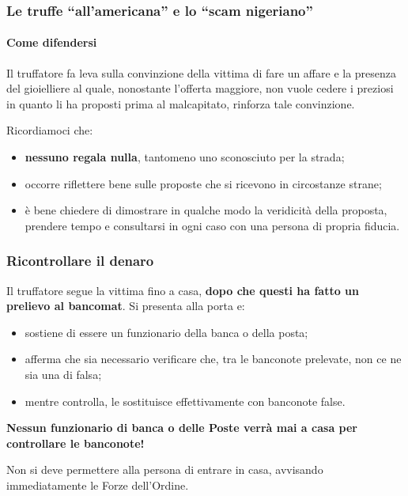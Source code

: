 \documentclass[11pt]{beamer}
\begin{document}
	\begin{frame}
		\frametitle{Le truffe ``all'americana'' e lo ``scam nigeriano''}
		\framesubtitle{Come difendersi}
		
		Il truffatore fa leva sulla convinzione della vittima di fare un affare e la presenza del gioielliere al quale, nonostante l'offerta maggiore, non vuole cedere i preziosi in quanto li ha proposti prima al malcapitato, rinforza tale convinzione.
		
		Ricordiamoci che:
		\begin{itemize}
			\item \textbf{nessuno regala nulla}, tantomeno uno sconosciuto per la strada;
			\item occorre riflettere bene sulle proposte che si ricevono in circostanze strane;
			\item è bene chiedere di dimostrare in qualche modo la veridicità della proposta, prendere tempo e consultarsi in ogni caso con una persona di propria fiducia.
		\end{itemize}	
	\end{frame}
	
	\begin{frame}
		\frametitle{Ricontrollare il denaro}
		
		Il truffatore segue la vittima fino a casa, \textbf{dopo che questi ha fatto un prelievo al bancomat}. Si presenta alla porta e:
		\begin{itemize}
			\item sostiene di essere un funzionario della banca o della posta;
			\item afferma che sia necessario verificare che, tra le banconote prelevate, non ce ne sia una di falsa;
			\item mentre controlla, le sostituisce effettivamente con banconote false.
		\end{itemize}
		
		\textbf{Nessun funzionario di banca o delle Poste verrà mai a casa per controllare le banconote!}
		
		Non si deve permettere alla persona di entrare in casa, avvisando immediatamente le Forze dell'Ordine.
		
	\end{frame}
	
\end{document}
